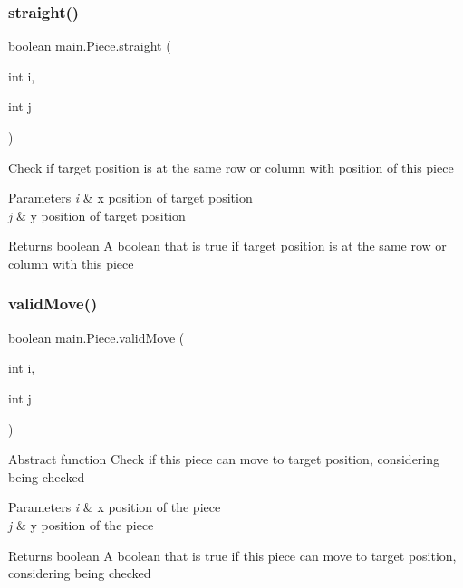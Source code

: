 \subsubsection{\texorpdfstring{straight()}{straight()}}
{\footnotesize\ttfamily boolean main.\+Piece.\+straight (\begin{DoxyParamCaption}\item[{int}]{i,  }\item[{int}]{j }\end{DoxyParamCaption})\hspace{0.3cm}{\ttfamily [inline]}}

Check if target position is at the same row or column with position of this piece 
\begin{DoxyParams}{Parameters}
{\em i} & x position of target position \\
\hline
{\em j} & y position of target position \\
\hline
\end{DoxyParams}
\begin{DoxyReturn}{Returns}
boolean A boolean that is true if target position is at the same row or column with this piece 
\end{DoxyReturn}
\mbox{\label{classmain_1_1_piece_a952556ebac11683ccca77a7a07390472}} 
\subsubsection{\texorpdfstring{validMove()}{validMove()}}
{\footnotesize\ttfamily boolean main.\+Piece.\+valid\+Move (\begin{DoxyParamCaption}\item[{int}]{i,  }\item[{int}]{j }\end{DoxyParamCaption})\hspace{0.3cm}{\ttfamily [inline]}}

Abstract function Check if this piece can move to target position, considering being checked 
\begin{DoxyParams}{Parameters}
{\em i} & x position of the piece \\
\hline
{\em j} & y position of the piece \\
\hline
\end{DoxyParams}
\begin{DoxyReturn}{Returns}
boolean A boolean that is true if this piece can move to target position, considering being checked 
\end{DoxyReturn}
\mbox{\label{classmain_1_1_piece_adf43c89b35f525bc50f56d67df57c430}} 
